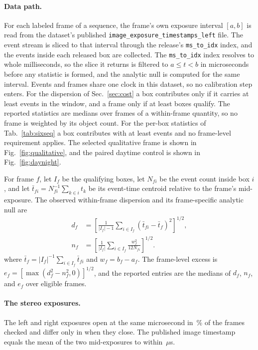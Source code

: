 \documentclass[10pt,twocolumn,letterpaper]{article}
\newcommand{\micro}{\ensuremath{\mu}}
\begin{document}
\paragraph{Data path.} For each labeled frame of a sequence, the frame's own
exposure interval $[a,b]$ is read from the dataset's published
\texttt{image\_exposure\_timestamps\_left} file. The event stream is sliced to
that interval through the release's \texttt{ms\_to\_idx} index, and the events
inside each released box are collected. The \texttt{ms\_to\_idx} index resolves to
whole milliseconds, so the slice it returns is filtered to $a\le t<b$ in
microseconds before any statistic is formed, and the analytic null is computed for
the same interval. Events and frames share one clock in this dataset, so no
calibration step enters. For the dispersion of Sec.~\ref{sec:cost} a box contributes
only if it carries at least \minEvents{} events in the window, and a frame only
if at least \minObjects{} boxes qualify. The reported statistics are medians over
frames of a within-frame quantity, so no frame is weighted by its object count.
For the per-box statistics of Tab.~\ref{tab:sixseq} a box contributes with at
least \sixMinEvents{} events and no frame-level requirement applies. The selected
qualitative frame is shown in Fig.~\ref{fig:qualitative}, and the paired
daytime control is shown in Fig.~\ref{fig:daynight}.

For frame $f$, let $I_f$ be the qualifying boxes, let $N_{fi}$ be the event count
inside box $i$, and let $\bar t_{fi}=N_{fi}^{-1}\sum_{k\in i}t_k$ be its event-time
centroid relative to the frame's mid-exposure. The observed within-frame dispersion
and its frame-specific analytic null are
\[
\begin{aligned}
d_f&=\left[\frac{1}{|I_f|-1}\sum_{i\in I_f}
 (\bar t_{fi}-\bar t_f)^2\right]^{1/2},\\
n_f&=\left[\frac{1}{|I_f|}\sum_{i\in I_f}
 \frac{w_f^2}{12N_{fi}}\right]^{1/2}.
\end{aligned}
\]
where $\bar t_f=|I_f|^{-1}\sum_{i\in I_f}\bar t_{fi}$ and $w_f=b_f-a_f$.
The frame-level excess is $e_f=[\max(d_f^2-n_f^2,0)]^{1/2}$, and the reported
entries are the medians of $d_f$, $n_f$, and $e_f$ over eligible frames.

\paragraph{The stereo exposures.} The left and right exposures open at the same microsecond
in \dsecCotriggerPct\,\% of the \dsecCotriggerFrames{} frames checked and differ only in
when they close. The published image timestamp equals the mean of the two
mid-exposures to within \dsecTsResidual\,\micro s.
\end{document}

